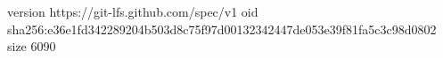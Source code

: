 version https://git-lfs.github.com/spec/v1
oid sha256:e36e1fd342289204b503d8c75f97d00132342447de053e39f81fa5c3c98d0802
size 6090
